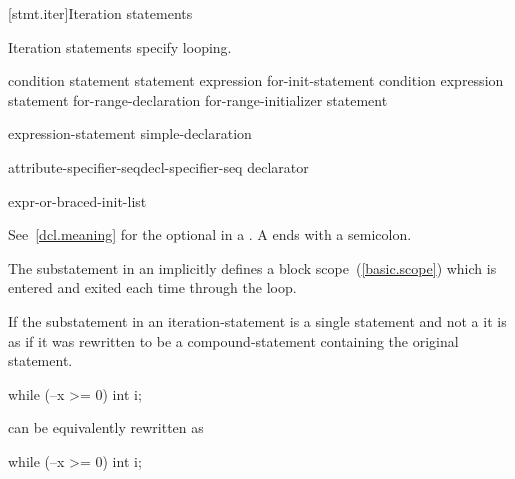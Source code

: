 [stmt.iter]{Iteration statements}%

\pnum
Iteration statements specify looping.

%
%
%
%
\begin{bnf}
\br
     condition \terminal{)} statement\br
     statement  expression \terminal{) ;}\br
     for-init-statement condition\opt{} \terminal{;} expression\opt{} \terminal{)} statement\br
     for-range-declaration \terminal{:} for-range-initializer \terminal{)} statement
\end{bnf}

\begin{bnf}
\br
    expression-statement\br
    simple-declaration
\end{bnf}

\begin{bnf}
\br
    attribute-specifier-seq\opt decl-specifier-seq declarator
\end{bnf}

\begin{bnf}
\br
    expr-or-braced-init-list\br
\end{bnf}

See~\ref{dcl.meaning} for the optional  in a
.
\enternote
A  ends with a semicolon.
\exitnote

\pnum
The substatement in an  implicitly defines
a block scope~(\ref{basic.scope}) which is entered and exited each time
through the loop.

%
If the substatement in an iteration-statement is a single statement and
not a  it is as if it was rewritten to be
a compound-statement containing the original statement.
\enterexample

\begin{codeblock}
while (--x >= 0)
  int i;
\end{codeblock}

can be equivalently rewritten as

\begin{codeblock}
while (--x >= 0) {
  int i;
}
\end{codeblock}

